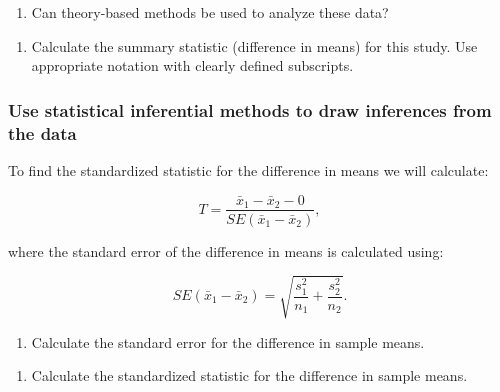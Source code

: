\documentclass[
]{report}
\providecommand{\tightlist}{%
  \setlength{\itemsep}{0pt}\setlength{\parskip}{0pt}}
\begin{document}
\begin{enumerate}
\def\labelenumi{\arabic{enumi}.}
\setcounter{enumi}{3}
\tightlist
\item
  Can theory-based methods be used to analyze these data?
\end{enumerate}

\vspace{1.2in}

\begin{enumerate}
\def\labelenumi{\arabic{enumi}.}
\setcounter{enumi}{4}
\tightlist
\item
  Calculate the summary statistic (difference in means) for this study. Use appropriate notation with clearly defined subscripts.
\end{enumerate}

\vspace{1in}

\subsubsection*{Use statistical inferential methods to draw inferences from the data}\label{use-statistical-inferential-methods-to-draw-inferences-from-the-data-4}

To find the standardized statistic for the difference in means we will calculate:

\[T = \frac{\bar{x}_1-\bar{x}_2 -0}{SE(\bar{x}_1-\bar{x}_2)},\]

where the standard error of the difference in means is calculated using:

\[SE(\bar{x}_1 -\bar{x}_2)=\sqrt{\frac{s_1^2}{n_1}+\frac{s_2^2}{n_2}}.\]

\begin{enumerate}
\def\labelenumi{\arabic{enumi}.}
\setcounter{enumi}{5}
\tightlist
\item
  Calculate the standard error for the difference in sample means.
\end{enumerate}

\vspace{0.5in}

\begin{enumerate}
\def\labelenumi{\arabic{enumi}.}
\setcounter{enumi}{6}
\tightlist
\item
  Calculate the standardized statistic for the difference in sample means.
\end{enumerate}
\end{document}
